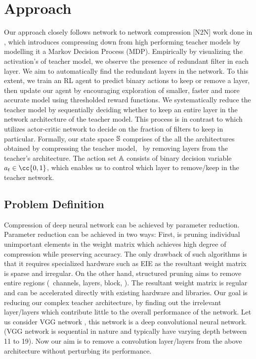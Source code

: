 \documentclass[../main]{subfiles}
\begin{document}
\section{Approach}
 \label{sec:approach}
    Our approach closely follows network to network compression [N2N] work done in \cite{ashok2017n2n}, which introduces compressing down from high performing teacher models by modelling it a Markov Decision Process (MDP).
    Empirically by visualizing the activation's of teacher model, we observe the presence of redundant filter in each layer.
    We aim to automatically find the redundant layers in the network.
    To this extent, we train an RL agent to predict binary actions to keep or remove a layer, then update our agent by encouraging exploration of smaller, faster and more accurate model using thresholded reward functions.
    We systematically reduce the teacher model by sequentially deciding whether to keep an entire layer in the network architecture of the teacher model.
    This process is in contrast to \cite{he2018amc} which utilizes actor-critic network to decide on the fraction of filters to keep in particular.
    Formally, our state space $\mathbb{S}$ comprises of the all the architectures obtained by compressing the teacher model, \ie~by removing layers from the teacher’s architecture.
    The action set $\mathbb{A}$ consists of binary decision variable $a_{t} \in \cc{0,1}$, which enables us to control which layer to remove/keep in the teacher network.

    \subsection{Problem Definition}
        \label{sec:num1}
        Compression of deep neural network can be achieved by parameter reduction.
        Parameter reduction can be achieved in two ways: First, is pruning individual unimportant elements in the weight matrix \cite{han2015deep} which achieves high degree of compression while preserving accuracy.
        The only drawback of such algorithms is that it requires specialized hardware such as EIE \cite{han2016eie} as the resultant weight matrix is sparse and irregular.
        On the other hand, structured pruning aims to remove entire regions (\eg~channels, layers, block, \etc).
        The resultant weight matrix is regular and can be accelerated directly with existing hardware and libraries.
        Our goal is reducing our complex teacher architecture, by finding out the irrelevant layer/layers which contribute little to the overall performance of the network.
        Let us consider VGG network \cite{simonyan2014very}, this network is a deep convolutional neural network.
        (VGG network is sequential in nature and typically have varying depth between 11 to 19).
        Now our aim is to remove a convolution layer/layers from the above architecture without perturbing its performance.
\end{document}
